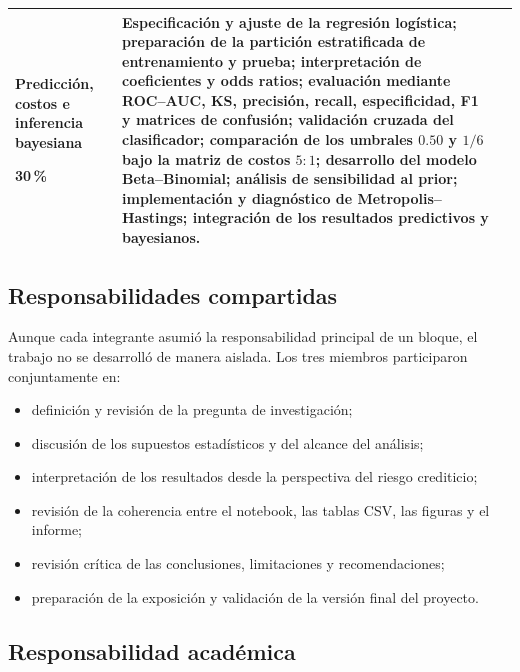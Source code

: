 \begin{table}[H]
\begin{tabularx}{\textwidth}{
        @{}
        >{\raggedright\arraybackslash}p{3.1cm}
        >{\raggedright\arraybackslash}p{2.7cm}
        X
        @{}
    }
        Predicción, costos e inferencia bayesiana

        \textbf{30\,\%}
        &
        Especificación y ajuste de la regresión logística; preparación
        de la partición estratificada de entrenamiento y prueba;
        interpretación de coeficientes y odds ratios; evaluación mediante
        ROC--AUC, KS, precisión, recall, especificidad, F1 y matrices de
        confusión; validación cruzada del clasificador; comparación de
        los umbrales \(0.50\) y \(1/6\) bajo la matriz de costos \(5:1\);
        desarrollo del modelo Beta--Binomial; análisis de sensibilidad
        al prior; implementación y diagnóstico de
        Metropolis--Hastings; integración de los resultados predictivos
        y bayesianos.
        \\

        \bottomrule
    \end{tabularx}
\end{table}

\subsection{Responsabilidades compartidas}

Aunque cada integrante asumió la responsabilidad principal de un bloque,
el trabajo no se desarrolló de manera aislada. Los tres miembros
participaron conjuntamente en:

\begin{itemize}
    \item definición y revisión de la pregunta de investigación;

    \item discusión de los supuestos estadísticos y del alcance del
    análisis;

    \item interpretación de los resultados desde la perspectiva del
    riesgo crediticio;

    \item revisión de la coherencia entre el notebook, las tablas CSV,
    las figuras y el informe;

    \item revisión crítica de las conclusiones, limitaciones y
    recomendaciones;

    \item preparación de la exposición y validación de la versión final
    del proyecto.
\end{itemize}

\subsection{Responsabilidad académica}

